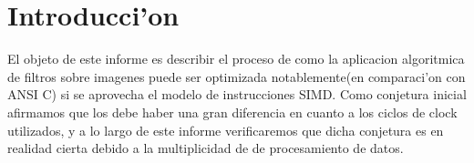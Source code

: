 \section{Introducci'on}

El objeto de este informe es describir el proceso de como la aplicacion algoritmica de filtros sobre imagenes
puede ser optimizada notablemente(en comparaci'on con ANSI C) si se aprovecha el modelo de instrucciones
SIMD. Como conjetura inicial afirmamos que los debe haber una  gran diferencia en cuanto a los ciclos
de clock utilizados, y a lo largo de este informe verificaremos que dicha conjetura es en realidad cierta
debido a la multiplicidad de de procesamiento de datos.
